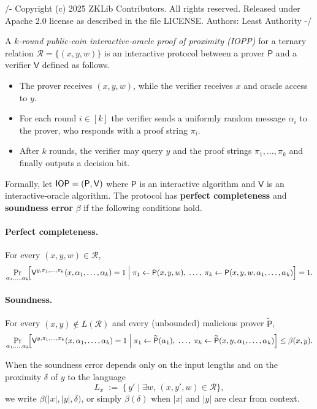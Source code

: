 /-
Copyright (c) 2025 ZKLib Contributors. All rights reserved.
Released under Apache 2.0 license as described in the file LICENSE.
Authors: Least Authority
-/

\begin{definition}\label{def:iopp}
    A \emph{$k$‑round public‑coin interactive‑oracle proof of proximity
    (IOPP)} for a ternary relation $\mathcal R = \{(x,y,w)\}$ is an
    interactive protocol between a prover $\mathsf P$ and a verifier
    $\mathsf V$ defined as follows.
    
    \begin{itemize}
      \item The prover receives $(x,y,w)$, while the verifier receives $x$
            and oracle access to $y$.
    
      \item For each round $i\in[k]$ the verifier sends a uniformly random
            message $\alpha_i$ to the prover, who responds with a proof
            string $\pi_i$.
    
      \item After $k$ rounds, the verifier may query $y$ and the proof
            strings $\pi_1,\dots,\pi_k$ and finally outputs a decision bit.
    \end{itemize}
    
    Formally, let $\mathsf{IOP}=(\mathsf P,\mathsf V)$ where $\mathsf P$ is an
    interactive algorithm and $\mathsf V$ is an interactive‑oracle algorithm.
    The protocol has \textbf{perfect completeness} and \textbf{soundness
    error} $\beta$ if the following conditions hold.
    
    \paragraph{Perfect completeness.}
    For every $(x,y,w)\in\mathcal R$,
    \[
      \Pr_{\alpha_1,\ldots,\alpha_k}\!\Bigl[
        \mathsf V^{y,\pi_1,\ldots,\pi_k}(x,\alpha_1,\ldots,\alpha_k)=1
        \;\Big|\;
        \pi_1\leftarrow\mathsf P(x,y,w),\;
        \dots,\;
        \pi_k\leftarrow\mathsf P(x,y,w,\alpha_1,\ldots,\alpha_k)
      \Bigr]=1.
    \]
    
    \paragraph{Soundness.}
    For every $(x,y)\notin L(\mathcal R)$ and every (unbounded) malicious
    prover $\widetilde{\mathsf P}$,
    \[
      \Pr_{\alpha_1,\ldots,\alpha_k}\!\Bigl[
        \mathsf V^{y,\pi_1,\ldots,\pi_k}(x,\alpha_1,\ldots,\alpha_k)=1
        \;\Big|\;
        \pi_1\leftarrow\widetilde{\mathsf P}(\alpha_1),\;
        \dots,\;
        \pi_k\leftarrow\widetilde{\mathsf P}
              (x,y,\alpha_1,\ldots,\alpha_k)
      \Bigr]\le \beta(x,y).
    \]
    
    When the soundness error depends only on the input lengths and on the
    proximity $\delta$ of $y$ to the language
    \[
      L_x \;:=\; \{\,y' \mid \exists w,\,(x,y',w)\in\mathcal R\},
    \]
    we write $\beta\bigl(|x|,|y|,\delta\bigr)$, or simply
    $\beta(\delta)$ when $|x|$ and $|y|$ are clear from context.
    \end{definition}
    